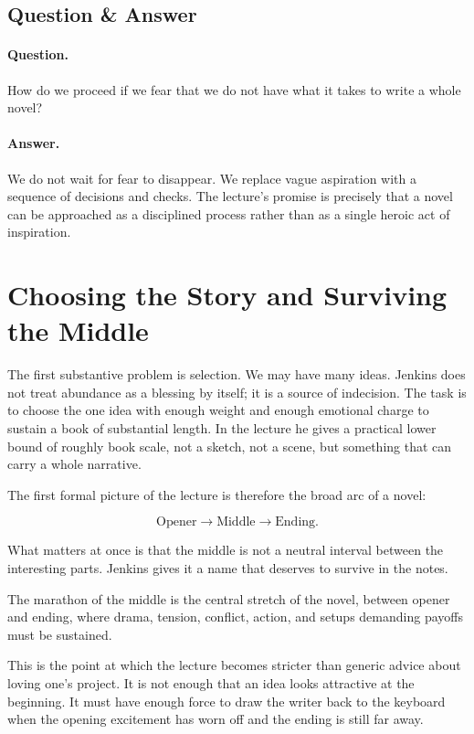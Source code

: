 \subsection{Question \& Answer}

\paragraph{Question.} How do we proceed if we fear that we do not have what it takes to write a whole novel?

\paragraph{Answer.} We do not wait for fear to disappear. We replace vague aspiration with a sequence of decisions and checks. The lecture's promise is precisely that a novel can be approached as a disciplined process rather than as a single heroic act of inspiration.

\section{Choosing the Story and Surviving the Middle}

The first substantive problem is selection. We may have many ideas. Jenkins does not treat abundance as a blessing by itself; it is a source of indecision. The task is to choose the one idea with enough weight and enough emotional charge to sustain a book of substantial length. In the lecture he gives a practical lower bound of roughly book scale, not a sketch, not a scene, but something that can carry a whole narrative.

The first formal picture of the lecture is therefore the broad arc of a novel:

\begin{equation}
\text{Opener} \to \text{Middle} \to \text{Ending}.
\end{equation}

What matters at once is that the middle is not a neutral interval between the interesting parts. Jenkins gives it a name that deserves to survive in the notes.

\begin{definition}
The marathon of the middle is the central stretch of the novel, between opener and ending, where drama, tension, conflict, action, and setups demanding payoffs must be sustained.
\end{definition}

This is the point at which the lecture becomes stricter than generic advice about loving one's project. It is not enough that an idea looks attractive at the beginning. It must have enough force to draw the writer back to the keyboard when the opening excitement has worn off and the ending is still far away.

